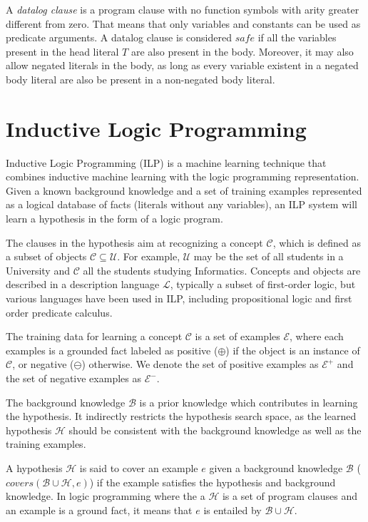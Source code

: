 A \emph{datalog clause} is a program clause with no function symbols with arity greater different from zero. That means
that only variables and constants can be used as predicate arguments. A datalog clause is considered $safe$ if all the
variables present in the head literal $T$ are also present in the body. Moreover, it may also allow negated literals in
the body, as long as every variable existent in a negated body literal are also be present in a non-negated body
literal.

\section{Inductive Logic Programming}

\cite{DBLP:journals/ml/LavracD96}
Inductive Logic Programming (ILP) is a machine learning technique that combines inductive machine learning with the
logic programming representation. Given a known background knowledge and a set of training examples represented as a
logical database of facts (literals without any variables), an ILP system will learn a hypothesis in the form of a
logic program.

The clauses in the hypothesis aim at recognizing a concept $\mathcal{C}$, which is defined as a subset of objects
$\mathcal{C} \subseteq \mathcal{U}$. For example, $\mathcal{U}$ may be the set of all students in a University and
$\mathcal{C}$ all the students studying Informatics.
Concepts and objects are described in a description language $\mathcal{L}$, typically a subset of first-order logic, but
various languages have been used in ILP, including propositional logic and first order predicate calculus.

The training data for learning a concept $\mathcal{C}$ is a set of examples $\mathcal{E}$, where each examples is a
grounded fact
labeled as positive ($\oplus$) if the object is an instance of $\mathcal{C}$, or negative ($\ominus$) otherwise. We
denote the set
of positive examples as $\mathcal{E}^{+}$ and the set of negative examples as $\mathcal{E}^{-}$.

The background knowledge $\mathcal{B}$ is a prior knowledge which contributes in learning the hypothesis. It indirectly
restricts the hypothesis search space, as  the learned hypothesis $\mathcal{H}$ should be consistent with the background
knowledge as well as the training examples.

A hypothesis $\mathcal{H}$ is said to cover an example $e$ given a background knowledge $\mathcal{B}$
($covers(\mathcal{B} \cup \mathcal{H},e)$) if the example satisfies the hypothesis and background knowledge. In logic
programming where the a $\mathcal{H}$ is a set of program clauses and an example is a ground fact, it means that $e$ is
entailed by $\mathcal{B} \cup \mathcal{H}$.

